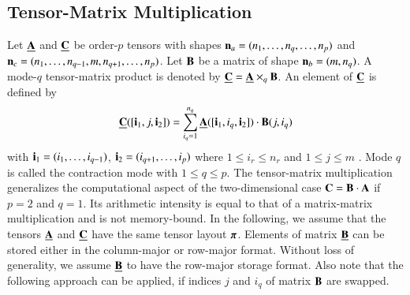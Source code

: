 \subsection{Tensor-Matrix Multiplication}
Let $\underline{\mathbf{A}}$ and $\underline{\mathbf{C}}$ be order-$p$ tensors with shapes $\mathbf{n}_a = (n_1,\dots,n_q,\dots,n_p)$ and $\mathbf{n}_c =(n_1,\dots,n_{q-1},m,n_{q+1},\dots,n_p)$. 
Let $\mathbf{B}$ be a matrix of shape $\mathbf{n}_b = (m,n_q)$.
A mode-$q$ tensor-matrix product is denoted by $\underline{\mathbf{C}} = \underline{\mathbf{A}} \times_q \mathbf{B}$. 
An element of $\underline{\mathbf{C}}$ is defined by
\begin{equation}
\label{equ:tensor.matrix.multplication}
\underline{\mathbf{C}}([\mathbf{i}_1, j, \mathbf{i}_2]) = \sum_{i_q=1}^{n_q} \underline{\mathbf{A}}([\mathbf{i}_1, i_q, \mathbf{i}_2]) \cdot \mathbf{B}(j,i_q)
\end{equation}
with $\mathbf{i}_1 = (i_1,\dots,i_{q-1})$, $\mathbf{i}_2 = (i_{q+1},\dots,i_p)$ where $1 \leq i_r \leq n_r$ and $1 \leq j \leq m$ \cite{li:2015:input, kolda:2009:decompositions}.
Mode $q$ is called the contraction mode with $1 \leq q \leq p$.
The tensor-matrix multiplication generalizes the computational aspect of the two-dimensional case $\mathbf{C} = \mathbf{B} \cdot \mathbf{A}$ if $p=2$ and $q=1$.
Its arithmetic intensity is equal to that of a matrix-matrix multiplication and is not memory-bound.
In the following, we assume that the tensors $\underline{\mathbf{A}}$ and $\underline{\mathbf{C}}$ have the same tensor layout $\boldsymbol{\pi}$. 
Elements of matrix $\underline{\mathbf{B}}$ can be stored either in the column-major or row-major format.
Without loss of generality, we assume $\underline{\mathbf{B}}$ to have the row-major storage format.
Also note that the following approach can be applied, if indices $j$ and $i_q$ of matrix $\mathbf{B}$ are swapped.
